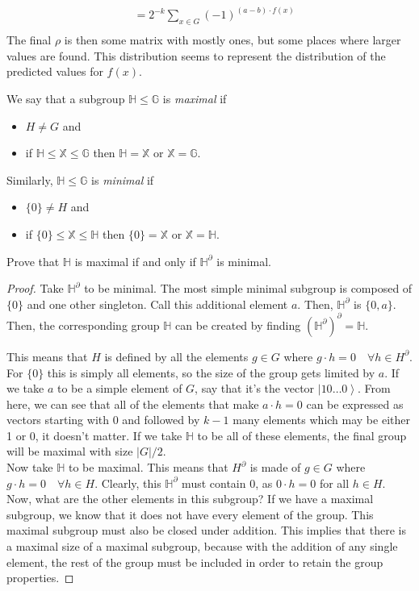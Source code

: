 \documentclass{exam} %
\newcommand{\m}[1]{\mathbb{#1}}    %
\theoremstyle{plain}
\theoremstyle{definition}
\theoremstyle{remark}
\numberwithin{equation}{section}  %
\newcommand{\ket}[1]{ \left| #1 \right> }
\begin{document}
\begin{questions}
\begin{solution}
\begin{align*}
    &= 2^{-k}\sum_{x\in G} (-1)^{(a-b)\cdot f(x)}\\
  \end{align*}
  The final $\rho$ is then some matrix with mostly ones, but some places where 
  larger values are found. This distribution seems to represent the distribution of
  the predicted values for $f(x)$. 
\end{solution}
\question We say that a subgroup $\m{H}\leq \m{G}$ is \emph{maximal} if
\begin{itemize}
  \item $H \neq G$ and
  \item if $\m{H} \leq \m{X}\leq \m{G}$ then $\m{H} = \m{X}$ or $\m{X} =
    \m{G}$.
\end{itemize}
Similarly, $\m{H}\leq \m{G}$ is \emph{minimal} if
\begin{itemize}
  \item $\{0\} \neq H$ and
  \item if $\{0\} \leq \m{X}\leq \m{H}$ then $\{0\} = \m{X}$ or $\m{X} =
    \m{H}$.
\end{itemize}
Prove that $\m{H}$ is maximal if and only if $\m{H}^{\partial}$ is minimal.
\begin{solution}
  \begin{proof}
    Take $\m{H}^\partial$ to be minimal. The most simple minimal subgroup
    is composed of $\{0\}$ and one other singleton. Call this additional 
    element $a$. Then, $\m{H}^\partial$ is $\{0, a\}$. Then, the corresponding
    group $\m{H}$ can be created by finding $(\m{H}^\partial)^\partial = \m{H}$.

    This means that $H$ is defined by all the elements $g \in G$ where $g\cdot h
    = 0 \quad \forall h \in H^\partial$. For $\{0\}$ this is simply all elements,
    so the size of the group gets limited by $a$. If we take $a$ to be a simple
    element of $G$, say that it's the vector $\ket{10\hdots0}$. From here, we
    can see that all of the elements that make $a\cdot h = 0$ can be expressed
    as vectors starting with $0$ and followed by $k-1$ many elements which may
    be either 1 or 0, it doesn't matter. If we take $\m{H}$ to be all of these
    elements, the final group will be maximal with size $|G|/2$.\\ 

    Now take $\m{H}$ to be maximal. This means that $H^\partial$ is made of $g 
    \in G$ where $g\cdot h = 0 \quad \forall h \in H$. Clearly, this 
    $\m{H}^\partial$ must 
    contain $0$, as $0\cdot h = 0$ for all $h \in H$. Now, what are the other
    elements in this subgroup? If we have a maximal subgroup, we know that it 
    does not have every element of the group. This maximal subgroup must also
    be closed under addition. This implies that there is a maximal size of
    a maximal subgroup, because with the addition of any single element, the
    rest of the group must be included in order to retain the group properties.


\end{proof}
\end{solution}
\end{questions}
\end{document}
